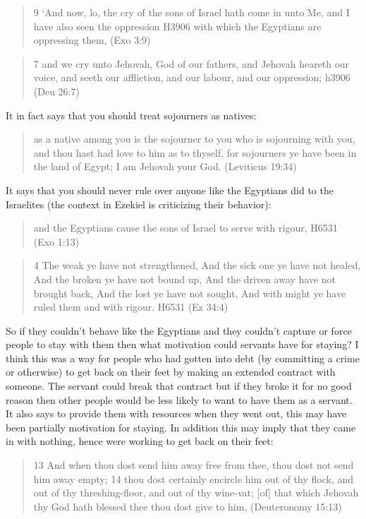 \documentclass[11pt]{article}
\begin{document}
\begin{quote}
9 `And now, lo, the cry of the sons of Israel hath come in unto Me, and I have also seen the oppression H3906 with which the Egyptians are oppressing them, (Exo 3:9)
\end{quote}
\begin{quote}
7 and we cry unto Jehovah, God of our fathers, and Jehovah heareth our voice, and seeth our affliction, and our labour, and our oppression; h3906 (Deu 26:7)
\end{quote}


It in fact says that you should treat sojourners as natives:
\begin{quote}
as a native among you is the sojourner to you who is sojourning with you, and thou hast had love to him as to thyself, for sojourners ye have been in the land of Egypt; I am Jehovah your God. (Leviticus 19:34)
\end{quote}

It says that you should never rule over anyone like the Egyptians did to the Israelites (the context in Ezekiel is criticizing their behavior):
 \begin{quote}
and the Egyptians cause the sons of Israel to serve with rigour, H6531 (Exo 1:13)
\end{quote}

\begin{quote}
4 The weak ye have not strengthened, And the sick one ye have not healed, And the broken ye have not bound up, And the driven away have not brought back, And the lost ye have not sought, And with might ye have ruled them and with rigour. H6531 (Ez 34:4)
\end{quote}

So if they couldn't behave like the Egyptians and they couldn't capture or force people to stay with them then what motivation could servants have for staying? I think this was a way for people who had gotten into debt (by committing a crime or otherwise) to get back on their feet by making an extended contract with someone. The servant could break that contract but if they broke it for no good reason then other people would be less likely to want to have them as a servant. It also says to provide them with resources when they went out, this may have been partially motivation for staying. In addition this may imply that they came in with nothing, hence were working to get back on their feet:
\begin{quote}
13 And when thou dost send him away free from thee, thou dost not send him away empty;
14 thou dost certainly encircle him out of thy flock, and out of thy threshing-floor, and out of thy wine-vat; [of] that which Jehovah thy God hath blessed thee thou dost give to him, (Deuteronomy 15:13)
\end{quote}
\end{document}
